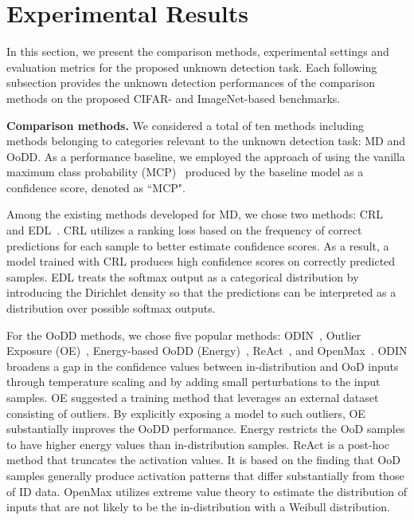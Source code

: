 \documentclass[preprint,12pt]{elsarticle}
\begin{document}
\section{Experimental Results} \label{sec:section4}
In this section, we present the comparison methods, experimental settings and evaluation metrics for the proposed unknown detection task. Each following subsection provides the unknown detection performances of the comparison methods on the proposed CIFAR- and ImageNet-based benchmarks.

\textbf{Comparison methods.}
We considered a total of ten methods including methods belonging to categories relevant to the unknown detection task: MD and OoDD. As a performance baseline, we employed the approach of using the vanilla maximum class probability (MCP)~\citep{hendrycks2016baseline} produced by the baseline model as a confidence score, denoted as ``MCP".

Among the existing methods developed for MD, we chose two methods: CRL~\citep{moon2020confidence} and EDL~\citep{sensoy2018edl}. CRL utilizes a ranking loss based on the frequency of correct predictions for each sample to better estimate confidence scores. As a result, a model trained with CRL produces high confidence scores on correctly predicted samples. EDL treats the softmax output as a categorical distribution by introducing the Dirichlet density so that the predictions can be interpreted as a distribution over possible softmax outputs.

For the OoDD methods, we chose five popular methods: ODIN~\citep{liang2017enhancing}, Outlier Exposure (OE)~\citep{hendrycks2018deep}, Energy-based OoDD (Energy)~\citep{liu2020energy}, ReAct~\citep{sun2021react}, and OpenMax~\citep{bendale2016towards}. ODIN broadens a gap in the confidence values between in-distribution and OoD inputs through temperature scaling and by adding small perturbations to the input samples. OE suggested a training method that leverages an external dataset consisting of outliers. By explicitly exposing a model to such outliers, OE substantially improves the OoDD performance. Energy restricts the OoD samples to have higher energy values than in-distribution samples. ReAct is a post-hoc method that truncates the activation values. It is based on the finding that OoD samples generally produce activation patterns that differ substantially from those of ID data. OpenMax utilizes extreme value theory to estimate the distribution of inputs that are not likely to be the in-distribution with a Weibull distribution.
\end{document}
